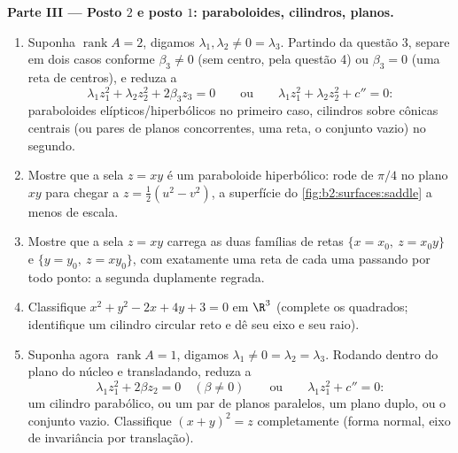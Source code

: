 \begin{problem}
\medskip
\noindent\textbf{Parte III --- Posto $2$ e posto $1$:
paraboloides, cilindros, planos.}
\begin{enumerate}[resume]
  \item Suponha $\operatorname{rank}A = 2$, digamos $\lambda_1,
        \lambda_2 \neq 0 = \lambda_3$. Partindo da questão
        3, separe em dois casos conforme $\beta_3 \neq 0$
        (sem centro, pela questão 4) ou $\beta_3 = 0$ (uma reta
        de centros), e reduza a
        \[
        \lambda_1z_1^2 + \lambda_2z_2^2 + 2\beta_3z_3 = 0
        \qquad\text{ou}\qquad
        \lambda_1z_1^2 + \lambda_2z_2^2 + c'' = 0 :
        \]
        paraboloides elípticos/hiperbólicos no primeiro caso,
        cilindros sobre cônicas centrais (ou pares de
        planos concorrentes, uma reta, o conjunto vazio) no
        segundo.
  \item Mostre que a sela $z = xy$ é um paraboloide
        hiperbólico: rode de $\pi/4$ no plano $xy$ para
        chegar a $z = \tfrac12(u^2 - v^2)$, a superfície do
        \cref{fig:b2:surfaces:saddle} a menos de escala.
  \item Mostre que a sela $z = xy$ carrega as duas famílias de
        retas $\{x = x_0,\ z = x_0y\}$ e $\{y = y_0,\ z
        = xy_0\}$, com exatamente uma reta de cada uma passando por
        todo ponto: a segunda  duplamente regrada.
  \item Classifique $x^2 + y^2 - 2x + 4y + 3 = 0$ em $\R^3$
        (complete os quadrados; identifique um cilindro
        circular reto e dê seu eixo e seu raio).
  \item Suponha agora $\operatorname{rank}A = 1$, digamos $\lambda_1
        \neq 0 = \lambda_2 = \lambda_3$. Rodando dentro do
        plano do núcleo e transladando, reduza a
        \[
        \lambda_1z_1^2 + 2\beta z_2 = 0 \quad (\beta \neq 0)
        \qquad\text{ou}\qquad
        \lambda_1z_1^2 + c'' = 0 :
        \]
        um cilindro parabólico, ou um par de planos paralelos, um
        plano duplo, ou o conjunto vazio. Classifique $(x + y)^2 =
        z$ completamente (forma normal, eixo de invariância por
        translação).
\end{enumerate}


\end{problem}
